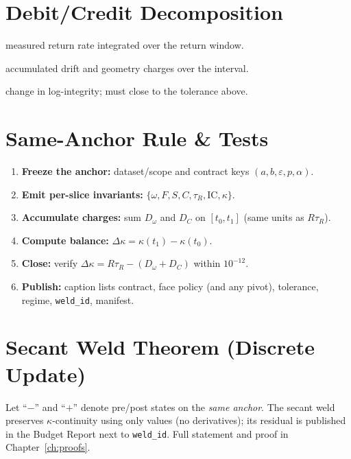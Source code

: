 \section{Debit/Credit Decomposition}
\begin{description}[leftmargin=1.2em,labelindent=0em,style=nextline]
  \item[Credits ($R\tau_{R}$)] measured return rate integrated over the return window.
  \item[Debits ($D_{\omega},D_{C}$)] accumulated drift and geometry charges over the interval.
  \item[Balance ($\Delta\kappa$)] change in log-integrity; must close to the tolerance above.
\end{description}

\section{Same-Anchor Rule \& Tests}
\begin{eqbox}
\small
\begin{enumerate}[leftmargin=1.25em]
  \item \textbf{Freeze the anchor:} dataset/scope and contract keys $(a,b,\varepsilon,p,\alpha)$.
  \item \textbf{Emit per-slice invariants:} \(\{\omega,F,S,C,\tau_R,\mathrm{IC},\kappa\}\).
  \item \textbf{Accumulate charges:} sum \(D_{\omega}\) and \(D_C\) on \(\left[t_0,t_1\right]\) (same units as \(R\tau_R\)).
  \item \textbf{Compute balance:} \(\Delta\kappa=\kappa(t_1)-\kappa(t_0)\).
  \item \textbf{Close:} verify \(\Delta\kappa = R\tau_R-(D_\omega+D_C)\) within \(10^{-12}\).
  \item \textbf{Publish:} caption lists contract, face policy (and any pivot), tolerance, regime, \texttt{weld\_id}, manifest.
\end{enumerate}
\end{eqbox}

\section{Secant Weld Theorem (Discrete Update)}
Let “\(-\)” and “\(+\)” denote pre/post states on the \emph{same anchor}. The secant weld preserves \(\kappa\)-continuity using only values (no derivatives); its residual is published in the Budget Report next to \texttt{weld\_id}. Full statement and proof in Chapter~\ref{ch:proofs}.

